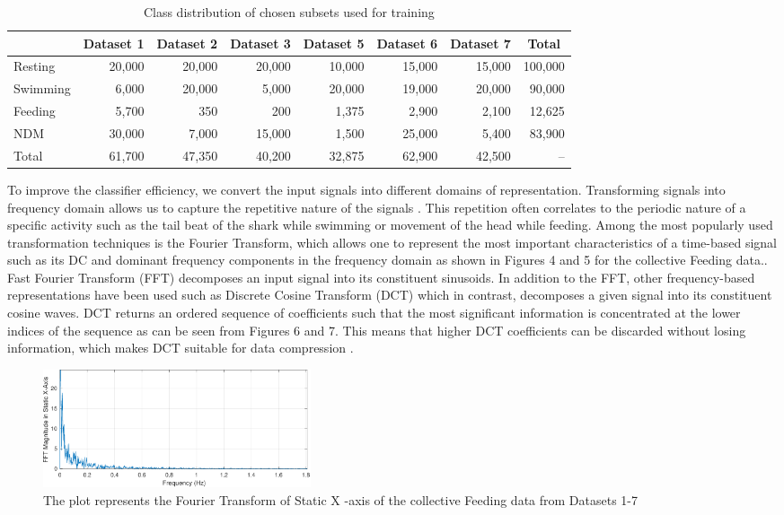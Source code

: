 \documentclass[conference]{IEEEtran}
\begin{document}
\begin{table}[tp!]
	\centering
	\caption{Class distribution of chosen subsets used for training}
	\begin{tabular}{l r r r r r r r}
	\hline
	& \textbf{Dataset 1} & \textbf{Dataset 2} & \textbf{Dataset 3} & \textbf{Dataset 5} & \textbf{Dataset 6} & \textbf{Dataset 7} & \multicolumn{1}{c}{\textbf{Total}}\\
	\hline
	Resting & 20,000 & 20,000 & 20,000 & 10,000 & 15,000 & 15,000 & 100,000 \\
	Swimming & 6,000 & 20,000 & 5,000 & 20,000 & 19,000 & 20,000 & 90,000 \\
	Feeding & 5,700 & 350 & 200 & 1,375 & 2,900 & 2,100 & 12,625 \\
	NDM & 30,000 & 7,000 & 15,000 & 1,500 & 25,000 & 5,400 & 83,900 \\
	Total & 61,700 & 47,350 & 40,200 & 32,875 & 62,900 & 42,500 & -- \\
	\hline
	\end{tabular}
	\label{}
\end{table}
To improve the classifier efficiency, we convert the input signals into different domains of representation. Transforming signals into frequency domain allows us to capture the repetitive nature of the signals \cite{13}. This repetition often correlates to the periodic nature of a specific activity such as the tail beat of the shark while swimming or movement of the head while feeding.  Among the most popularly used transformation techniques is the Fourier Transform, which allows one to represent the most important characteristics of a time-based signal such as its  DC and dominant frequency components in the frequency domain as shown in Figures 4 and 5 for the collective Feeding data.\cite{13}. Fast Fourier Transform (FFT) decomposes an input signal into its constituent sinusoids. In addition to the FFT, other frequency-based representations have been used such as Discrete Cosine Transform (DCT) which in contrast, decomposes a given signal into its constituent cosine waves. DCT returns an ordered sequence of coefficients such that the most significant information is concentrated at the lower indices of the sequence as can be seen from Figures 6 and 7.  This means that higher DCT coefficients can be discarded without losing information, which makes DCT suitable for data compression \cite{14}.
\begin{figure}[h!]
	\centering
	\includegraphics[width=3.1in]{3_feed_static_fft.pdf}
	\caption{The plot represents the Fourier Transform of Static X -axis of the collective Feeding data from Datasets 1-7 }
	\label{dynamic}
\end{figure}
\end{document}
